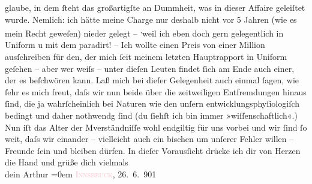                glaube, in dem ſteht das großartigſte an Dummheit, was in dieser Affaire geleiſtet
               wurde. Nemlich: ich hätte meine {\pb}Charge nur deshalb
               nicht vor 5 Jahren (wie es mein Recht geweſen) nieder gelegt – \substVorne{}\textsuperscript{,}\substDazwischen{}weil\substHinten{} ich eben doch gern gelegentlich in Uniform \introOben{}u\introOben{} mit
               dem \label{K_L01134_2v}\label{K_L01134_2h} paradirt! – Ich wollte einen Preis von einer Million
               ausſchreiben für den, der mich ſeit meinem letzten Hauptrapport in Uniform geſehen –
               aber wer weiſs – unter dieſen Leuten findet ſich am Ende auch einer, der es
               beſchwören kann.\pend
           \pstart
           Laß mich bei dieſer Gelegenheit auch einmal ſagen, wie ſehr es {\pb}mich freut, daſs wir
               nun beide über die \label{LL036-1v}zeitweiligen
                  Entfremdungen\label{LL036-1h} hinaus ſind, die ja wahrſcheinlich bei Naturen wie den
               unſern entwicklungsphyſiologiſch bedingt und daher nothwendg ſind (du ſiehſt ich bin
               immer »wiſſenschaftlich«.) Nun iſt das Alter der Mverständniſſe wohl endgiltig für uns vorbei und wir ſind ſo weit, daſs wir
               einander – vielleicht auch ein bischen um unſerer Fehler willen – Freunde ſein und
                  {\pb}bleiben dürfen.\pend
           \pstart
           In dieſer Vorausſicht drücke ich dir von Herzen die Hand und grüße dich
               vielmals{\\[\baselineskip]} dein \spacefill\mbox{Arthur}\pend
           \leftskip=0em{}\pstart
           \textsc{\textcolor{pink}{Innsbruck}{}\ledrightnote{\textcolor{pink}{Innsbruck}}}, 26. 6. 901\pend
           \endnumbering{}  
      
